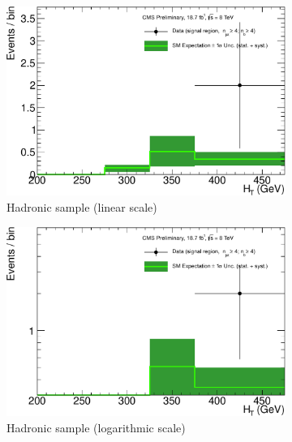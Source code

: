 \clearpage
\begin{figure}[h!]
  \centering
  \begin{subfigure}[b]{0.48\textwidth}
    \includegraphics[width=\textwidth]
    {Figs/results/v0/greenBand/single_plots/hadronic_ge4b_ge4j.pdf}
    \caption{Hadronic sample (linear scale)}
  \end{subfigure}
  \vspace{0.7cm}\begin{subfigure}[b]{0.48\textwidth}
    \includegraphics[width=\textwidth]
    {Figs/results/v0/greenBand/single_plots/hadronic_ge4b_ge4j_logy.pdf}
    \caption{Hadronic sample (logarithmic scale)}
  \end{subfigure}
  \begin{subfigure}[b]{0.48\textwidth}

\end{subfigure}
\end{figure}
